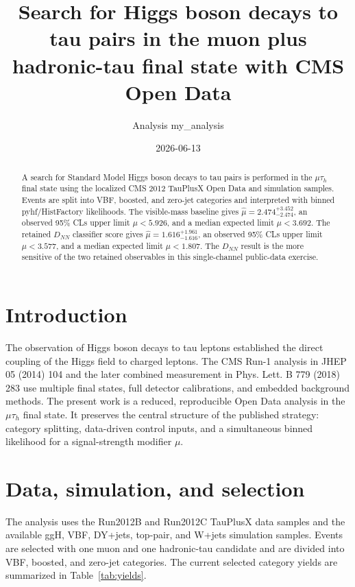 \documentclass[aps,prl,reprint,superscriptaddress,nofootinbib]{revtex4-2}
\begin{document}
\title{Search for Higgs boson decays to tau pairs in the muon plus hadronic-tau final state with CMS Open Data}
\author{Analysis my\_analysis}
\date{2026-06-13}

\begin{abstract}
A search for Standard Model Higgs boson decays to tau pairs is performed in the
$\mu\tau_h$ final state using the localized CMS 2012 TauPlusX Open Data and
simulation samples.  Events are split into VBF, boosted, and zero-jet
categories and interpreted with binned pyhf/HistFactory likelihoods.  The
visible-mass baseline gives $\hat{\mu}=2.474^{+3.452}_{-2.474}$,
an observed 95\% CLs upper limit $\mu<5.926$, and a
median expected limit $\mu<3.692$.  The retained $D_{NN}$ classifier
score gives $\hat{\mu}=1.616^{+1.961}_{-1.616}$,
an observed 95\% CLs upper limit $\mu<3.577$, and a
median expected limit $\mu<1.807$.  The $D_{NN}$ result is the more
sensitive of the two retained observables in this single-channel public-data
exercise.
\end{abstract}

\maketitle

\section{Introduction}
The observation of Higgs boson decays to tau leptons established the direct
coupling of the Higgs field to charged leptons.  The CMS Run-1 analysis in
JHEP 05 (2014) 104 and the later combined measurement in Phys. Lett. B 779
(2018) 283 use multiple final states, full detector calibrations, and embedded
background methods.  The present work is a reduced, reproducible Open Data
analysis in the $\mu\tau_h$ final state.  It preserves the central structure of
the published strategy: category splitting, data-driven control inputs, and a
simultaneous binned likelihood for a signal-strength modifier $\mu$.

\section{Data, simulation, and selection}
The analysis uses the Run2012B and Run2012C TauPlusX data samples and the
available ggH, VBF, DY+jets, top-pair, and W+jets simulation samples.  Events
are selected with one muon and one hadronic-tau candidate and are divided into
VBF, boosted, and zero-jet categories.  The current selected category yields
are summarized in Table~\ref{tab:yields}.
\end{document}
